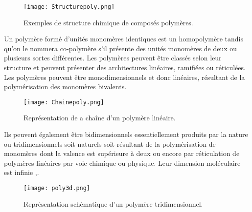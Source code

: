 \begin{figure}[h]
\centering
\texttt{[image: Structurepoly.png]}
\caption{Exemples de structure chimique de compos\'es polym\`eres. {\citep{fontanille2014chimie}}} 
\label{structurepoly}
\end{figure}
\FloatBarrier
\par{
Un polym\`ere form\'e d'unit\'es monom\`eres identiques est un homopolym\`ere tandis qu'on le nommera co-polym\`ere s'il pr\'esente des unit\'es monom\`eres de deux ou plusieurs sortes diff\'erentes. Les polym\`eres peuvent \^etre class\'es selon leur structure et peuvent pr\'esenter des architectures lin\'eaires, ramifi\'ees ou r\'eticul\'ees. Les polym\`eres peuvent \^etre monodimensionnels et donc lin\'eaires, r\'esultant de la polym\'erisation des monom\`eres bivalents.
}

\begin{figure}[h]
\centering
\texttt{[image: Chainepoly.png]}
\caption{Repr\'esentation de a cha\^ine d'un polym\`ere lin\'eaire. {\citep{fontanille2014chimie}}} 
\label{chainepoly}
\end{figure}
\FloatBarrier
\par{
Ils peuvent \'egalement \^etre bidimensionnels essentiellement produits par la nature ou tridimensionnels soit naturels soit r\'esultant de la polym\'erisation de monom\`eres dont la valence est sup\'erieure \`a deux ou encore par r\'eticulation de polym\`eres lin\'eaires par voie chimique ou physique. Leur dimension mol\'eculaire est infinie {\citep{fontanille2014chimie},\citep{Valorplast}}.
}
\begin{figure}[h]
\centering
\texttt{[image: poly3d.png]}
\caption{Repr\'esentation sch\'ematique d'un polym\`ere tridimensionnel. {\citep{fontanille2014chimie}}} 
\label{poly3d}
\end{figure}
\FloatBarrier

